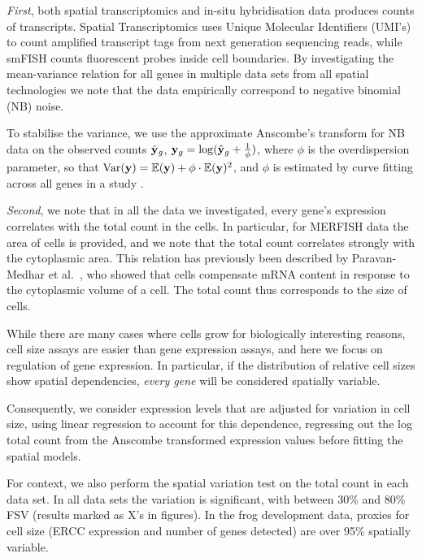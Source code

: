\textit{First}, both spatial transcriptomics and in-situ hybridisation data produces counts of transcripts. Spatial Transcriptomics uses Unique Molecular Identifiers (UMI's) to count amplified transcript tags from next generation sequencing reads, while smFISH counts fluorescent probes inside cell boundaries. By investigating the mean-variance relation for all genes in multiple data sets from all spatial technologies we note that the data empirically correspond to negative binomial (NB) noise. 

To stabilise the variance, we use the approximate Anscombe's transform for NB data on the observed counts \( \hat{{\bf y}}_g \), \( {\bf y}_g = \log(\hat{{\bf y}}_g + \frac{1}{\phi}) \), where \( \phi \) is the overdispersion parameter, so that \( \text{Var}({\bf y}) = \mathbb{E}({\bf y}) + \phi \cdot \mathbb{E}({\bf y})^2 \), and \( \phi \) is estimated by curve fitting across all genes in a study \cite{Anscombe1948-uw}.

\textit{Second}, we note that in all the data we investigated, every gene's expression correlates with the total count in the cells. In particular, for MERFISH data the area of cells is provided, and we note that the total count correlates strongly with the cytoplasmic area.  This relation has previously been described by Paravan-Medhar et al.~\cite{Padovan-Merhar2015-ne}, who showed that cells compensate mRNA content in response to the cytoplasmic volume of a cell. The total count thus corresponds to the size of cells.

While there are many cases where cells grow for biologically interesting reasons, cell size assays are easier than gene expression assays, and here we focus on regulation of gene expression.  In particular, if the distribution of relative cell sizes show spatial dependencies, \emph{every gene} will be considered spatially variable.

Consequently, we consider expression levels that are adjusted for variation in cell size, using linear regression to account for this dependence, regressing out the log total count from the Anscombe transformed expression values before fitting the spatial models.

For context, we also perform the spatial variation test on the total count in each data set. In all data sets the variation is significant, with between 30\% and 80\% FSV (results marked as X's in figures). In the frog development data, proxies for cell size (ERCC expression and number of genes detected) are over 95\% spatially variable.


